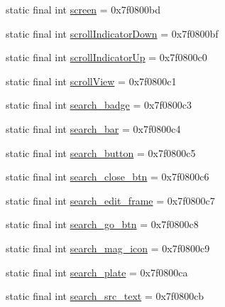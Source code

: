 \begin{DoxyCompactItemize}
\item 
static final int \mbox{\hyperlink{classandroid_1_1support_1_1v7_1_1appcompat_1_1_r_1_1id_a999bf5411538fa6caab27efaeddea15e}{screen}} = 0x7f0800bd
\item 
static final int \mbox{\hyperlink{classandroid_1_1support_1_1v7_1_1appcompat_1_1_r_1_1id_a7e3bdeb1ba7e1d2a81995fb3225f0b86}{scroll\+Indicator\+Down}} = 0x7f0800bf
\item 
static final int \mbox{\hyperlink{classandroid_1_1support_1_1v7_1_1appcompat_1_1_r_1_1id_a331a78b0369cf9e185e49132315336cd}{scroll\+Indicator\+Up}} = 0x7f0800c0
\item 
static final int \mbox{\hyperlink{classandroid_1_1support_1_1v7_1_1appcompat_1_1_r_1_1id_a2c75911e3d2885b50876721cd34f2cc6}{scroll\+View}} = 0x7f0800c1
\item 
static final int \mbox{\hyperlink{classandroid_1_1support_1_1v7_1_1appcompat_1_1_r_1_1id_a2ee860df597b218b135c65ac1241c346}{search\+\_\+badge}} = 0x7f0800c3
\item 
static final int \mbox{\hyperlink{classandroid_1_1support_1_1v7_1_1appcompat_1_1_r_1_1id_a37282400460588b9933a8f3b8c74d577}{search\+\_\+bar}} = 0x7f0800c4
\item 
static final int \mbox{\hyperlink{classandroid_1_1support_1_1v7_1_1appcompat_1_1_r_1_1id_a9a458b08585f3fe2c509d27967fbfa5a}{search\+\_\+button}} = 0x7f0800c5
\item 
static final int \mbox{\hyperlink{classandroid_1_1support_1_1v7_1_1appcompat_1_1_r_1_1id_a6af82c5fe032136546b41b96b191c185}{search\+\_\+close\+\_\+btn}} = 0x7f0800c6
\item 
static final int \mbox{\hyperlink{classandroid_1_1support_1_1v7_1_1appcompat_1_1_r_1_1id_a8b2c997939e7855cb1513ebc8deb69c5}{search\+\_\+edit\+\_\+frame}} = 0x7f0800c7
\item 
static final int \mbox{\hyperlink{classandroid_1_1support_1_1v7_1_1appcompat_1_1_r_1_1id_a55313edde7c5ac6053e414c67e43c4db}{search\+\_\+go\+\_\+btn}} = 0x7f0800c8
\item 
static final int \mbox{\hyperlink{classandroid_1_1support_1_1v7_1_1appcompat_1_1_r_1_1id_aad15bb656dd8d095094b7085bf2fecee}{search\+\_\+mag\+\_\+icon}} = 0x7f0800c9
\item 
static final int \mbox{\hyperlink{classandroid_1_1support_1_1v7_1_1appcompat_1_1_r_1_1id_ae9cb3debcecb3c277a635dc221a0025e}{search\+\_\+plate}} = 0x7f0800ca
\item 
static final int \mbox{\hyperlink{classandroid_1_1support_1_1v7_1_1appcompat_1_1_r_1_1id_a2766f5877537681409847f9e8460ffeb}{search\+\_\+src\+\_\+text}} = 0x7f0800cb

\end{DoxyCompactItemize}
